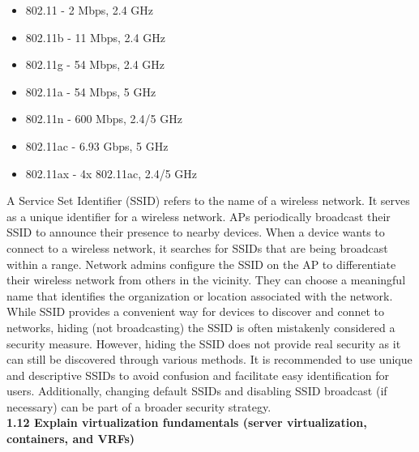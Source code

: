 \documentclass{article}
\begin{document}
\begin{itemize}	
\item 802.11 - 2 Mbps, 2.4 GHz
\item 802.11b - 11 Mbps, 2.4 GHz
\item 802.11g - 54 Mbps, 2.4 GHz
\item 802.11a - 54 Mbps, 5 GHz
\item 802.11n - 600 Mbps, 2.4/5 GHz
\item 802.11ac - 6.93 Gbps, 5 GHz
\item 802.11ax - 4x 802.11ac, 2.4/5 GHz
\end{itemize}

	A Service Set Identifier (SSID) refers to the name of a wireless network. It serves as a unique identifier for a wireless network. APs periodically broadcast their SSID to announce their presence to nearby devices. When a device wants to connect to a wireless network, it searches for SSIDs that are being broadcast within a range. Network admins configure the SSID on the AP to differentiate their wireless network from others in the vicinity. They can choose a meaningful name that identifies the organization or location associated with the network. While SSID provides a convenient way for devices to discover and connet to networks, hiding (not broadcasting) the SSID is often mistakenly considered a security measure. However, hiding the SSID does not provide real security as it can still be discovered through various methods. It is recommended to use unique and descriptive SSIDs to avoid confusion and facilitate easy identification for users. Additionally, changing default SSIDs and disabling SSID broadcast (if necessary) can be part of a broader security strategy.\\
 
 \textbf{1.12 Explain virtualization fundamentals (server virtualization, containers, and VRFs)}\\
 
\end{document}
